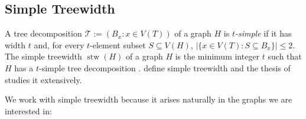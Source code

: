 \documentclass[kpfonts]{patmorin}
\DeclareMathOperator{\stw}{stw}
\theoremstyle{named}
\begin{document}
%

\subsection{Simple Treewidth}


A tree decomposition $\mathcal{T}:=(B_x:x\in V(T))$ of a graph $H$ is \emph{$t$-simple} if it has width $t$ and, for every $t$-element subset $S\subseteq V(H)$, $|\{x\in V(T):S\subseteq B_x\}|\le 2$.  The simple treewidth $\stw(H)$ of a graph $H$ is the minimum integer $t$ such that $H$ has a $t$-simple tree decomposition \cite{knauer.ueckerdt:simple}.  \citet{knauer.ueckerdt:simple} define simple treewidth and the thesis of \citet{wulf:stacked} studies it extensively.

%

We work with simple treewidth because it arises naturally in the graphs we are interested in:
\end{document}

